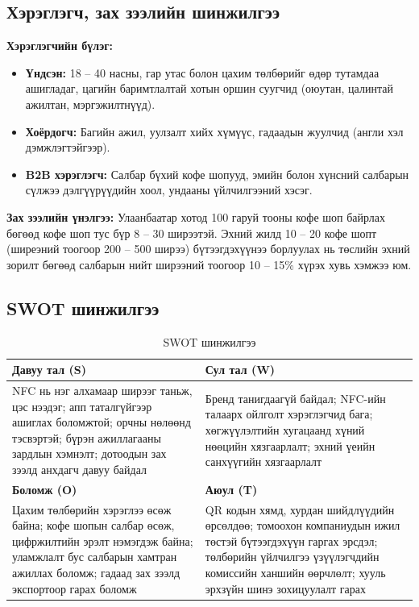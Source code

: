 \subsection{Хэрэглэгч, зах зээлийн шинжилгээ}

\textbf{Хэрэглэгчийн бүлэг:}

\begin{itemize}
  \item \textbf{Үндсэн:} 18 -- 40 насны, гар утас болон цахим төлбөрийг
        өдөр тутамдаа ашигладаг, цагийн баримтлалтай хотын оршин суугчид
        (оюутан, цалинтай ажилтан, мэргэжилтнүүд).
  \item \textbf{Хоёрдогч:} Багийн ажил, уулзалт хийх хүмүүс, гадаадын
        жуулчид (англи хэл дэмжлэгтэйгээр).
  \item \textbf{B2B хэрэглэгч:} Салбар бүхий кофе шопууд, эмийн болон
        хүнсний салбарын сүлжээ дэлгүүрүүдийн хоол, ундааны
        үйлчилгээний хэсэг.
\end{itemize}

\textbf{Зах зээлийн үнэлгээ:} Улаанбаатар хотод 100 гаруй тооны кофе шоп
байрлах бөгөөд кофе шоп тус бүр 8 -- 30 ширээтэй. Эхний жилд 10 -- 20
кофе шопт (ширеэний тоогоор 200 -- 500 ширээ) бүтээгдэхүүнээ
борлуулах нь төслийн эхний зорилт бөгөөд салбарын нийт ширээний
тоогоор 10 -- 15\% хүрэх хувь хэмжээ юм.

\subsection{SWOT шинжилгээ}

\begin{table}[h]
  \centering
  \caption{SWOT шинжилгээ}
  \label{tab:ch2-swot}
  \small
  \begin{tabular}{@{}p{7.0cm}p{7.0cm}@{}}
    \toprule
    \textbf{Давуу тал (S)} & \textbf{Сул тал (W)} \\ \midrule
    NFC нь нэг алхамаар ширээг таньж, цэс нээдэг; апп таталгүйгээр
    ашиглах боломжтой; орчны нөлөөнд тэсвэртэй; бүрэн ажиллагааны
    зардлын хэмнэлт; дотоодын зах зээлд анхдагч давуу байдал &
    Бренд танигдаагүй байдал; NFC-ийн талаарх ойлголт хэрэглэгчид
    бага; хөгжүүлэлтийн хугацаанд хүний нөөцийн хязгаарлалт; эхний
    үеийн санхүүгийн хязгаарлалт \\ \midrule
    \textbf{Боломж (O)} & \textbf{Аюул (T)} \\ \midrule
    Цахим төлбөрийн хэрэглээ өсөж байна; кофе шопын салбар өсөж,
    цифржилтийн эрэлт нэмэгдэж байна; уламжлалт бус салбарын
    хамтран ажиллах боломж; гадаад зах зээлд экспортоор гарах
    боломж &
    QR кодын хямд, хурдан шийдлүүдийн өрсөлдөө; томоохон
    компаниудын ижил төстэй бүтээгдэхүүн гаргах эрсдэл; төлбөрийн
    үйлчилгээ үзүүлэгчдийн комиссийн ханшийн өөрчлөлт; хууль
    эрхзүйн шинэ зохицуулалт гарах \\ \bottomrule
  \end{tabular}
\end{table}

